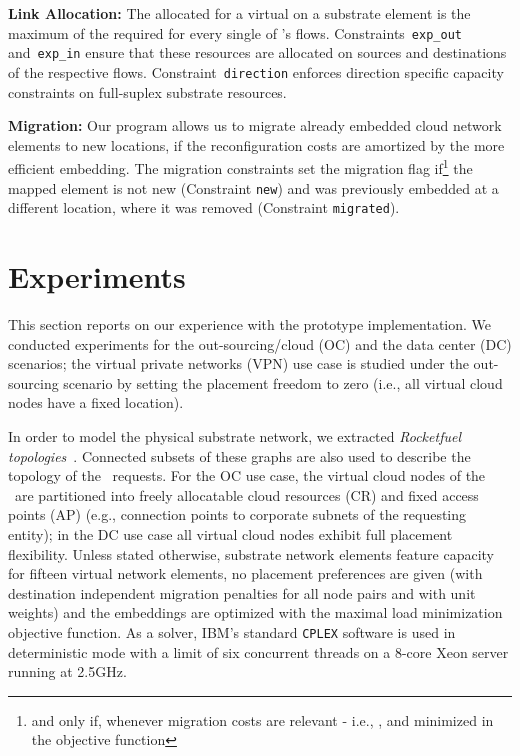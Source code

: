 \documentclass[conference,10pt]{IEEEtran}
\newcommand{\CloudNet}{\text{CloudNet}}
\newcommand{\CloudNets}{\text{CloudNets}}
\begin{document}
\begin{description*}
\item \textbf{Link Allocation:}
  The  allocated for a virtual  on a substrate element  is the maximum of the  required for every single of 's flows.
  Constraints~\texttt{exp\_out} and~\texttt{exp\_in}
  ensure that these resources are allocated on sources and destinations of the respective flows.
  Constraint~\texttt{direction} enforces direction specific capacity constraints on full-suplex substrate resources.

\item \textbf{Migration:} Our program allows us to migrate already embedded cloud network
  elements to new locations, if the reconfiguration costs are amortized by the
  more efficient embedding.
  The migration constraints set the migration flag
   if\footnote{and only if, whenever migration costs are relevant - i.e., , and minimized in the objective function}
  the mapped element is not new (Constraint
  \texttt{new}) and was previously embedded at a different location, where it was removed
  (Constraint \texttt{migrated}).
\end{description*}






\section{Experiments} \label{sec:experiments}


This section reports on our experience with the prototype
implementation. We conducted experiments for the out-sourcing/cloud
(OC) and the data center (DC) scenarios; the virtual private
networks (VPN) use case is studied under the out-sourcing scenario
by setting the placement freedom to zero (i.e., all virtual cloud
nodes have a fixed location).

In order to model the physical substrate network, we extracted
\emph{Rocketfuel topologies}~\cite{rocketfuel}. Connected subsets of
these graphs are also used to describe the topology of the
\CloudNet\ requests. For the OC use case, the virtual cloud nodes of
the \CloudNets\ are partitioned into freely allocatable cloud
resources (CR) and fixed access points (AP) (e.g., connection points
to corporate subnets of the requesting entity); in the DC use case
all virtual cloud nodes exhibit full placement flexibility. Unless
stated otherwise, substrate network elements feature capacity for
fifteen virtual network elements, no placement preferences are given
(with destination independent migration penalties for all node pairs
and with unit weights)
and the
embeddings are optimized with the maximal load minimization
objective function. As a solver, IBM's standard \texttt{CPLEX}
software is used in deterministic mode with a limit of six
concurrent threads on a 8-core Xeon server running at 2.5GHz.
\end{document}
